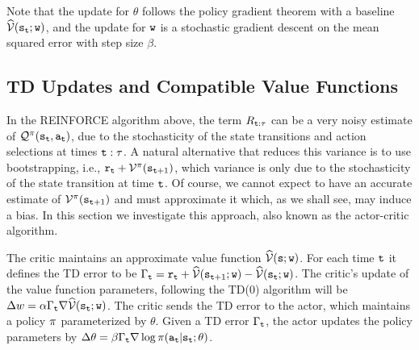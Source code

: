 Note that the update for $\theta$ follows the policy gradient theorem with a baseline $\widehat{\mathcal{V}}({\tt s}_{\tt t};{\tt w})$, and the update for ${\tt w}$ is a stochastic gradient descent on the mean squared error with step size $\beta$.



\subsection{TD Updates and Compatible Value Functions}

In the REINFORCE algorithm above, the term $R_{{\tt t}:\tau}$ can be a very noisy estimate of $\mathcal{Q}^\pi
({\tt s}_{{\tt t}},{\tt a}_{{\tt t}})$, due to the stochasticity of the state transitions and action selections at times ${\tt t}:\tau$. A natural alternative that reduces this variance is to use bootstrapping, i.e., ${\tt r}_{{\tt t}} + \mathcal{V}^{\pi}({\tt s}_{{\tt t}+1})$, which variance is only due to the stochasticity of the state transition at time ${\tt t}$. Of course, we cannot expect to have an accurate estimate of $\mathcal{V}^{\pi}({\tt s}_{{\tt t}+1})$ and must approximate it which, as we shall see, may induce a bias. In this section we investigate this approach, also known as the actor-critic algorithm.


The critic maintains an approximate value function $\widehat{\mathcal{V}}({\tt s};{\tt w})$. For each time ${\tt t}$ it defines the TD error to be $\Gamma_{\tt t} = {\tt r}_{\tt t} +\widehat{\mathcal{V}}({\tt s}_{{\tt t}+1};{\tt w})-\widehat{\mathcal{V}}({\tt s}_{\tt t};{\tt w})$. The critic's update of the value function parameters, following the TD(0) algorithm will be $\Delta w=\alpha\Gamma_{\tt t} \nabla \widehat{\mathcal{V}}({\tt s}_{\tt t};{\tt w})$. The critic sends the TD error to the actor, which maintains a policy $\pi$ parameterized by $\theta$. Given a TD error $\Gamma_{\tt t}$, the actor updates the policy parameters by $\Delta \theta= \beta \Gamma_{\tt t} \nabla \log \pi({\tt a}_{\tt t}|{\tt s}_{\tt t};\theta)$. 

